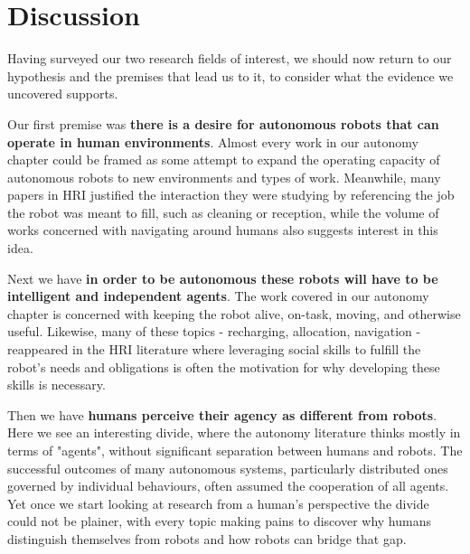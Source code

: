 \documentclass{sfuthesis}
\begin{document}













\chapter{Discussion}

Having surveyed our two research fields of interest, we should now return to our hypothesis and the premises that lead us to it, to consider what the evidence we uncovered supports.

Our first premise was \textbf{there is a desire for autonomous robots that can operate in human environments}. Almost every work in our autonomy chapter could be framed as some attempt to expand the operating capacity of autonomous robots to new environments and types of work. Meanwhile, many papers in HRI justified the interaction they were studying by referencing the job the robot was meant to fill, such as cleaning or reception, while the volume of works concerned with navigating around humans also suggests interest in this idea.

Next we have \textbf{in order to be autonomous these robots will have to be intelligent and independent agents}. The work covered in our autonomy chapter is concerned with keeping the robot alive, on-task, moving, and otherwise useful. Likewise, many of these topics - recharging, allocation, navigation - reappeared in the HRI literature where leveraging social skills to fulfill the robot's needs and obligations is often the motivation for why developing these skills is necessary.

Then we have \textbf{humans perceive their agency as different from robots}. Here we see an interesting divide, where the autonomy literature thinks mostly in terms of "agents", without significant separation between humans and robots. The successful outcomes of many autonomous systems, particularly distributed ones governed by individual behaviours, often assumed the cooperation of all agents. Yet once we start looking at research from a human's perspective the divide could not be plainer, with every topic making pains to discover why humans distinguish themselves from robots and how robots can bridge that gap.
\end{document}
